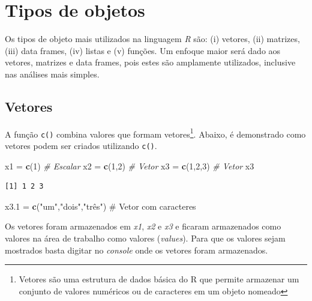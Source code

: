 \documentclass[]{book}
\makeatletter
\newenvironment{Shaded}{\begin{snugshade}}{\end{snugshade}}
\newcommand{\CommentTok}[1]{\textcolor[rgb]{0.56,0.35,0.01}{\textit{#1}}}
\newcommand{\DecValTok}[1]{\textcolor[rgb]{0.00,0.00,0.81}{#1}}
\newcommand{\FloatTok}[1]{\textcolor[rgb]{0.00,0.00,0.81}{#1}}
\newcommand{\KeywordTok}[1]{\textcolor[rgb]{0.13,0.29,0.53}{\textbf{#1}}}
\newcommand{\NormalTok}[1]{#1}
\newcommand{\StringTok}[1]{\textcolor[rgb]{0.31,0.60,0.02}{#1}}
\let\rmarkdownfootnote\footnote%
\def\footnote{\protect\rmarkdownfootnote}
\newcommand{\indf}[1]{\index[function]{#1@\texttt{#1()}|ST}}
\newcommand{\indt}[1]{\index{#1|ST}}
\makeatother
\begin{document}
\hypertarget{objects}{%
\chapter{Tipos de objetos}\label{objects}}

Os tipos de objeto mais utilizados na linguagem \emph{R} são: (i) vetores, (ii) matrizes, (iii) data frames, (iv) listas e (v) funções. Um enfoque maior será dado aos vetores, matrizes e data frames, pois estes são amplamente utilizados, inclusive nas análises mais simples.

\hypertarget{vetores}{%
\section{Vetores}\label{vetores}}

A função \texttt{c()} \indt{vetores} \indf{c} combina valores que formam vetores\footnote{Vetores são uma estrutura de dados básica do R que permite armazenar um conjunto de valores numéricos ou de caracteres em um objeto nomeado}. Abaixo, é demonstrado como vetores podem ser criados utilizando \texttt{c()}.

\begin{Shaded}
\begin{Highlighting}[]
\NormalTok{x1 =}\StringTok{ }\KeywordTok{c}\NormalTok{(}\DecValTok{1}\NormalTok{) }\CommentTok{# Escalar }
\NormalTok{x2 =}\StringTok{ }\KeywordTok{c}\NormalTok{(}\DecValTok{1}\NormalTok{,}\DecValTok{2}\NormalTok{) }\CommentTok{# Vetor}
\NormalTok{x3 =}\StringTok{ }\KeywordTok{c}\NormalTok{(}\DecValTok{1}\NormalTok{,}\DecValTok{2}\NormalTok{,}\DecValTok{3}\NormalTok{) }\CommentTok{# Vetor}
\NormalTok{x3}
\end{Highlighting}
\end{Shaded}

\begin{verbatim}
[1] 1 2 3
\end{verbatim}

\begin{Shaded}
\begin{Highlighting}[]
\NormalTok{x3}\FloatTok{.1}\NormalTok{ =}\StringTok{ }\KeywordTok{c}\NormalTok{(}\StringTok{"um"}\NormalTok{,}\StringTok{"dois"}\NormalTok{,}\StringTok{"três") # Vetor com caracteres}
\end{Highlighting}
\end{Shaded}

Os vetores foram armazenados em \emph{x1}, \emph{x2} e \emph{x3} e ficaram armazenados como valores na área de trabalho como valores (\emph{values}). Para que os valores sejam mostrados basta digitar no \emph{console} onde os vetores foram armazenados.
\end{document}
